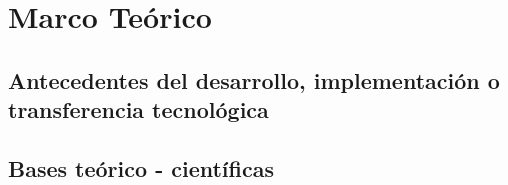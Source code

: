 \chapter{Marco Teórico}

\section{Antecedentes del desarrollo, implementación o transferencia tecnológica}

\section{Bases teórico - científicas}